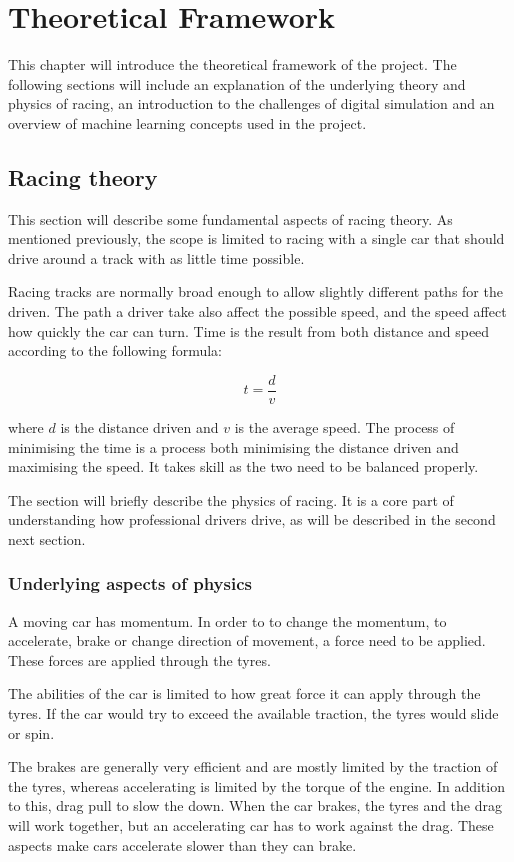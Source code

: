 \chapter{Theoretical Framework}
This chapter will introduce the theoretical framework of the project. The following sections will include an explanation of the underlying theory and physics of racing, an introduction to the challenges of digital simulation and an overview of machine learning concepts used in the project. 


\section{Racing theory}
This section will describe some fundamental aspects of racing theory. As mentioned previously, the scope is limited to racing with a single car that should drive around a track with as little time possible.

Racing tracks are normally broad enough to allow slightly different paths for the driven. The path a driver take also affect the possible speed, and the speed affect how quickly the car can turn. Time is the result from both distance and speed according to the following formula:

\[
t = \frac{d}{v}
\]

where $d$ is the distance driven and $v$ is the average speed. The process of minimising the time is a process both minimising the distance driven and maximising the speed. It takes skill as the two need to be balanced properly.

The section will briefly describe the physics of racing. It is a core part of understanding how professional drivers drive, as will be described in the second next section.

\subsection{Underlying aspects of physics}
A moving car has momentum. In order to to change the momentum, to accelerate, brake or change direction of movement, a force need to be applied. These forces are applied through the tyres. 

The abilities of the car is limited to how great force it can apply through the tyres. If the car would try to exceed the available traction, the tyres would slide or spin. 

The brakes are generally very efficient and are mostly limited by the traction of the tyres, whereas accelerating is limited by the torque of the engine. In addition to this, drag pull to slow the down. When the car brakes, the tyres and the drag will work together, but an accelerating car has to work against the drag. These aspects make cars accelerate slower than they can brake.

